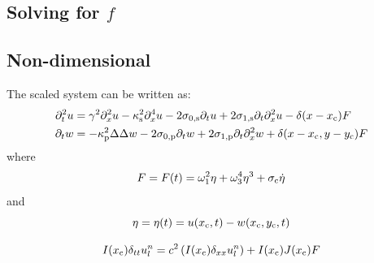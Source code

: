\subsection{Solving for $f$}


\subsection{Non-dimensional}
The scaled system can be written as:
\begin{align}
    \ptt u &= \gamma^2 \pxx u - \kappa_\stxt^2 \pxxxx u - 2\szX[,\stxt]\pt u + 2\soX[,\stxt] \pt\pxx u - \delta(x-x_\ctxt)F\\
   \pt w &= -\kappa_\ptxt^2\Delta\Delta w - 2\szX[,\ptxt]\pt w + 2\soX[,\ptxt] \pt\pxx w + \delta(x-x_\ctxt, y-y_\ctxt)F
\end{align}
where
\begin{equation}
    F = F(t) = \omega_1^2\eta+\omega_3^4\eta^3+\sigma_{\text{c}} \dot\eta
\end{equation}
and
\begin{equation}
    \eta = \eta(t) = u(x_{\text{c}}, t) - w(x_{\text{c}}, y_{\text{c}}, t)
\end{equation}


\begin{equation}
    I(x_{\text{c}})\delta_{tt}u_l^n = c^2
    \left(I(x_{\text{c}})\delta_{xx}u_l^n\right) + I(x_{\text{c}})J(x_{\text{c}})F
\end{equation}